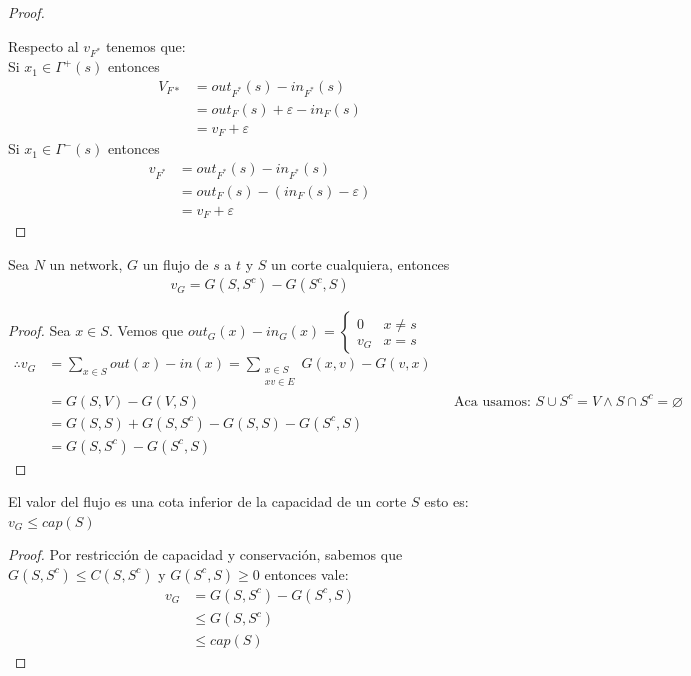 \begin{proof}
\begin{enumerate}
\end{enumerate}

Respecto al $v_{F^*}$ tenemos que:\\
Si $x_1 \in \Gamma^+(s)$ entonces
\begin{align}
    V_{F*} &= out_{F^*}(s) - in_{F^*}(s)\\
        &= out_F(s) + \varepsilon - in_{F}(s)\\
        &= v_F + \varepsilon
\end{align}
Si $x_1 \in \Gamma^-(s)$ entonces
\begin{align}
    v_{F^*} &= out_{F^{*}}(s) - in_{F^*}(s)\\
        &= out_F(s) - (in_F(s) - \varepsilon)\\
        &= v_F + \varepsilon
\end{align}
\end{proof}

\begin{lemma}
Sea $N$ un network, $G$ un flujo de $s$ a $t$ y $S$ un corte cualquiera, entonces
\begin{align}
    v_G = G(S, S^c) - G(S^c, S)
\end{align}
\end{lemma}

\begin{proof}
Sea $x\in S$. Vemos que $out_G(x) - in_G(x) = \left\{
    \begin{array}{cc}
     0  &x\neq s\\
     v_G &x = s
    \end{array}
\right.$\\

\begin{align}
    \therefore v_G &= \sum_{x\in S} out(x) - in(x) = \sum_{\substack{x\in S\\xv \in E}} G(x,v) - G(v,x)\\
    &= G(S,V) - G(V,S)  &&\text{Aca usamos: } S \cup S^c = V \wedge S \cap S^c = \varnothing \\
    &= G(S,S) + G(S, S^c) - G(S,S) - G(S^c, S)\\
    &= G(S,S^c) - G(S^c, S)
\end{align}

\end{proof}

\begin{corollary}
El valor del flujo es una cota inferior de la capacidad de un corte $S$ esto es: $v_G \le cap(S)$
\end{corollary}
\begin{proof}
Por restricción de capacidad y conservación, sabemos que \\$G(S, S^c) \le C(S, S^c)$ y $G(S^c, S) \ge 0$ entonces vale:
\begin{align}
v_G &= G(S, S^c) - G(S^c, S)\\
	&\le G(S, S^c)\\
    &\le cap(S)
\end{align}
\end{proof}

